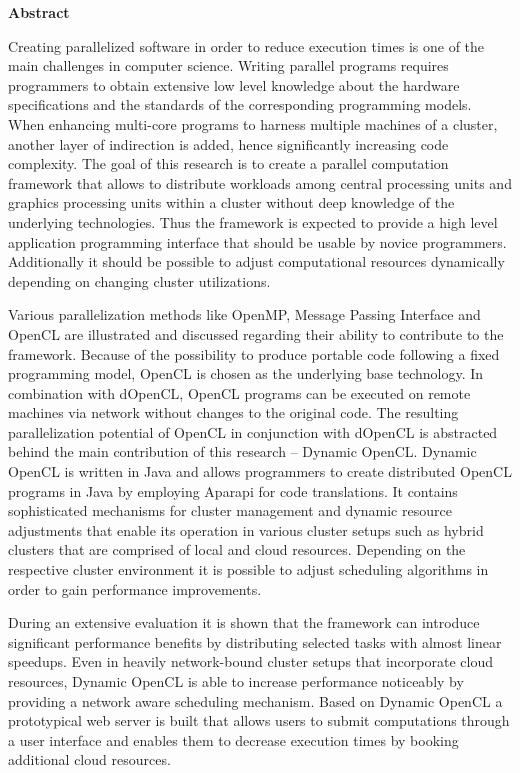 \begin{center}\textsf{\textbf{Abstract}}\end{center}

\noindent Creating parallelized software in order to reduce execution times is one of the main challenges in computer science. Writing parallel programs requires programmers to obtain extensive low level knowledge about the hardware specifications and the standards of the corresponding programming models. When enhancing multi-core programs to harness multiple machines of a cluster, another layer of indirection is added, hence significantly increasing code complexity. The goal of this research is to create a parallel computation framework that allows to distribute workloads among central processing units and graphics processing units within a cluster without deep knowledge of the underlying technologies. Thus the framework is expected to provide a high level application programming interface that should be usable by novice programmers. Additionally it should be possible to adjust computational resources dynamically depending on changing cluster utilizations.

Various parallelization methods like OpenMP, Message Passing Interface and OpenCL are illustrated and discussed regarding their ability to contribute to the framework. Because of the possibility to produce portable code following a fixed programming model, OpenCL is chosen as the underlying base technology. In combination with dOpenCL, OpenCL programs can be executed on remote machines via network without changes to the original code. The resulting parallelization potential of OpenCL in conjunction with dOpenCL is abstracted behind the main contribution of this research -- Dynamic OpenCL. Dynamic OpenCL is written in Java and allows programmers to create distributed OpenCL programs in Java by employing Aparapi for code translations. It contains sophisticated mechanisms for cluster management and dynamic resource adjustments that enable its operation in various cluster setups such as hybrid clusters that are comprised of local and cloud resources. Depending on the respective cluster environment it is possible to adjust scheduling algorithms in order to gain performance improvements.

During an extensive evaluation it is shown that the framework can introduce significant performance benefits by distributing selected tasks with almost linear speedups. Even in heavily network-bound cluster setups that incorporate cloud resources, Dynamic OpenCL is able to increase performance noticeably by providing a network aware scheduling mechanism. Based on Dynamic OpenCL a prototypical web server is built that allows users to submit computations through a user interface and enables them to decrease execution times by booking additional cloud resources.


